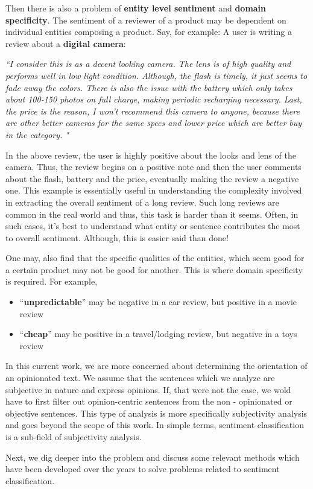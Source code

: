 Then there is also a problem of \textbf{entity level sentiment} and \textbf{domain specificity}. The sentiment of a reviewer of a product may be dependent on individual entities composing a product. Say, for example: A user is writing a review about a \textbf{digital camera}: 

\textit{``I consider this is as a decent looking camera. The lens is of high quality and performs well in low light condition. Although, the flash is timely, it just seems to fade away the colors. There is also the issue with the battery which only takes about 100-150 photos on full charge, making periodic recharging necessary. Last, the price is the reason, I won't recommend this camera to anyone, because there are other better cameras for the same specs and lower price which are better buy in the category. "}

In the above review, the user is highly positive about the looks and lens of the camera. Thus, the review begins on a positive note and then the user comments about the flash, battery and the price, eventually making the review a negative one. This example is essentially useful in understanding the complexity involved in extracting the overall sentiment of a long review. Such long reviews are common in the real world and thus, this task is harder than it seems. Often, in such cases, it's best to understand what entity or sentence contributes the most to overall sentiment. Although, this is easier said than done! 

One may, also find that the specific qualities of the entities, which seem good for a certain product may not be good for another. This is where domain specificity is required. For example,
\begin{itemize}
\item  “\textbf{unpredictable}” may be negative in a car review, but positive in a movie review~\parencite{ch1:turney}
\item “\textbf{cheap}” may be positive in a travel/lodging review, but negative in a toys review
\end{itemize}

In this current work, we are more concerned about determining the orientation of an opinionated text. We assume that the sentences which we analyze are subjective in nature and express opinions. If, that were not the case, we wold have to first filter out opinion-centric sentences from the non - opinionated or objective sentences. This type of analysis is more specifically subjectivity analysis and goes beyond the scope of this work. In simple terms, sentiment classification is a sub-field of subjectivity analysis.

Next, we dig deeper into the problem and discuss some relevant methods which have been developed over the years to solve problems related to sentiment classification.   